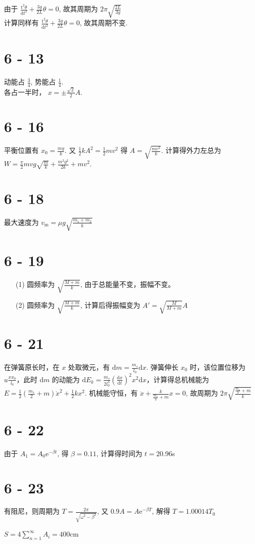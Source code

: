 \documentclass{article}
\begin{document}
由于 $\frac{\mathrm{t}^2\theta}{\mathrm{d}t^2} + \frac{3g}{2L}\theta = 0$, 故其周期为 $2\pi\sqrt{\frac{2L}{3g}}$ \\
计算同样有 $\frac{\mathrm{t}^2\theta}{\mathrm{d}t^2} + \frac{3g}{2L}\theta = 0$, 故其周期不变.

\section*{6 - 13}

动能占 $\frac{3}{4}$, 势能占 $\frac{1}{4}$. \\
各占一半时， $x = \pm \frac{\sqrt{2}}{2}A$.

\section*{6 - 16}

平衡位置有 $x_0 = \frac{mg}{k}$. 又 $\frac{1}{2}kA^2 = \frac{1}{2}mv^2$ 得 $A = \sqrt{\frac{mv^2}{k}}$. 计算得外力左总为 $W = \frac{\pi}{2}mvg\sqrt{\frac{m}{k}} + \frac{m^2g^2}{2k} + mv^2$.

\section*{6 - 18}

最大速度为 $v_{\mathrm{m}} = \mu g\sqrt{\frac{m_1 + m_2}{k}}$

\section*{6 - 19}

\begin{itemize}
    \item [(1)] 圆频率为 $\sqrt{\frac{M + m}{k}}$, 由于总能量不变，振幅不变。
    \item [(2)] 圆频率为 $\sqrt{\frac{M + m}{k}}$, 计算后得振幅变为 $A' = \sqrt{\frac{M}{M + m}}A$
\end{itemize}

\section*{6 - 21}

在弹簧原长时，在 $x$ 处取微元，有 $\mathrm{d}m = \frac{m_s}{l_0}\mathrm{d}x$. 弹簧伸长 $x_0$ 时，该位置位移为 $u \frac{xx_0}{l_0}$，此时 $\mathrm{d}m$ 的动能为 $\mathrm{d}E_k = \frac{m_s}{2l_0^3}\left(\frac{\mathrm{d}x}{\mathrm{d}t}\right)^2x^2\mathrm{d}x$，计算得总机械能为 $E = \frac{1}{2}\left(\frac{m_s}{2} + m\right)\dot{x}^2 + \frac{1}{2}kx^2$. 机械能守恒，有 $\ddot{x} + \frac{k}{\frac{m_s}{3} + m}x = 0$, 故周期为 $2\pi\sqrt{\frac{\frac{m_s}{3} + m}{k}}$

\section*{6 - 22}

由于 $A_1 = A_0 \mathrm{e}^{-\beta t}$, 得 $\beta = 0.11$, 计算得时间为 $t = 20.96$s

\section*{6 - 23}

有阻尼，则周期为 $T = \frac{2\pi}{\sqrt{\omega^2 - \beta^2}}$, 又 $0.9 A = A\mathrm{e}^{-\beta T} $, 解得 $T = 1.00014T_0$

$S = 4\sum_{n = 1}^{\infty}A_i = 400$cm
\end{document}
